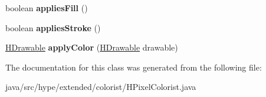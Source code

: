 \begin{DoxyCompactItemize}
\item 
\hypertarget{classhype_1_1extended_1_1colorist_1_1_h_pixel_colorist_ad64d134497642db825f8d0b5bf36743b}{boolean {\bfseries applies\-Fill} ()}\label{classhype_1_1extended_1_1colorist_1_1_h_pixel_colorist_ad64d134497642db825f8d0b5bf36743b}

\item 
\hypertarget{classhype_1_1extended_1_1colorist_1_1_h_pixel_colorist_ab0e8d9eca0f7d5a971d65309755cebb7}{boolean {\bfseries applies\-Stroke} ()}\label{classhype_1_1extended_1_1colorist_1_1_h_pixel_colorist_ab0e8d9eca0f7d5a971d65309755cebb7}

\item 
\hypertarget{classhype_1_1extended_1_1colorist_1_1_h_pixel_colorist_a4fac2d99dc33c2c276bf9e3275300ade}{\hyperlink{classhype_1_1core_1_1drawable_1_1_h_drawable}{H\-Drawable} {\bfseries apply\-Color} (\hyperlink{classhype_1_1core_1_1drawable_1_1_h_drawable}{H\-Drawable} drawable)}\label{classhype_1_1extended_1_1colorist_1_1_h_pixel_colorist_a4fac2d99dc33c2c276bf9e3275300ade}

\end{DoxyCompactItemize}


The documentation for this class was generated from the following file\-:\begin{DoxyCompactItemize}
\item 
java/src/hype/extended/colorist/H\-Pixel\-Colorist.\-java\end{DoxyCompactItemize}
